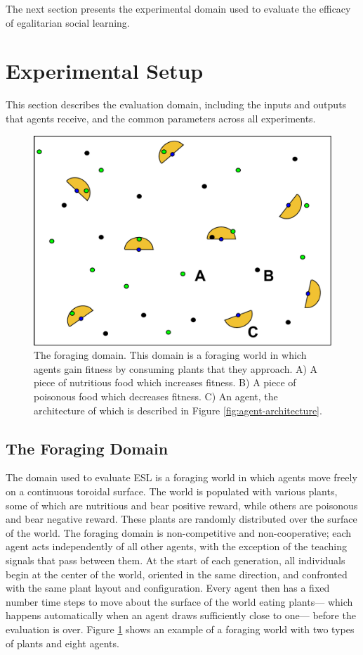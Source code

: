 \documentclass{sig-alternate}
\begin{document}
The next section presents the experimental domain used to evaluate the efficacy of egalitarian social learning.

\section{Experimental Setup}
\label{sec:setup}
This section describes the evaluation domain, including the inputs and outputs that agents receive, and the common parameters across all experiments.

\begin{figure}[t]
  \centering
    \includegraphics[scale=.333]{world.pdf}
  \caption{The foraging domain. This domain is a foraging world in which agents gain fitness by consuming plants that they approach.  A) A piece of nutritious food which increases fitness. B) A piece of poisonous food which decreases fitness. C) An agent, the architecture of which is described in Figure \ref{fig:agent-architecture}.}
  \label{fig:foraging-world}
\end{figure}

\subsection*{The Foraging Domain}
The domain used to evaluate ESL is a foraging world in which agents move freely on a continuous toroidal surface. The world is populated with various plants, some of which are nutritious and bear positive reward, while others are poisonous and bear negative reward. These plants are randomly distributed over the surface of the world. The foraging domain is non-competitive and non-cooperative; each agent acts independently of all other agents, with the exception of the teaching signals that pass between them. At the start of each generation, all individuals begin at the center of the world, oriented in the same direction, and confronted with the same plant layout and configuration. Every agent then has a fixed number time steps to move about the surface of the world eating plants--- which happens automatically when an agent draws sufficiently close to one--- before the evaluation is over. Figure \ref{fig:foraging-world} shows an example of a foraging world with two types of plants and eight agents.
    
\end{document}
